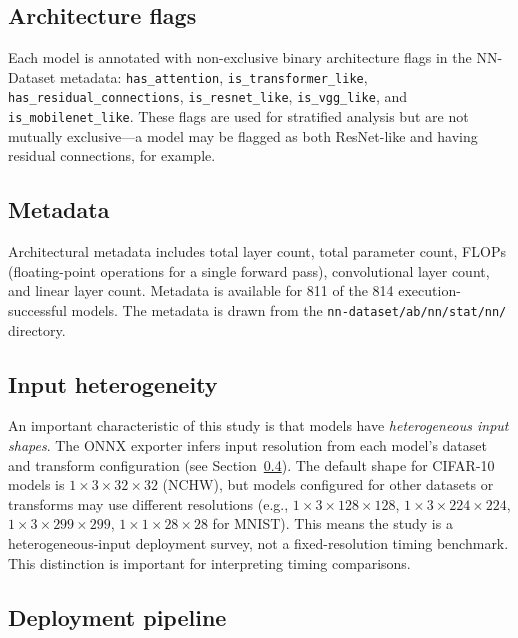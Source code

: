 \documentclass[10pt,twocolumn]{article}
\begin{document}
\subsection{Architecture flags}

Each model is annotated with non-exclusive binary architecture flags in the NN-Dataset metadata: \texttt{has\_attention}, \texttt{is\_transformer\_like}, \texttt{has\_residual\_connections}, \texttt{is\_resnet\_like}, \texttt{is\_vgg\_like}, and \texttt{is\_mobilenet\_like}. These flags are used for stratified analysis but are not mutually exclusive---a model may be flagged as both ResNet-like and having residual connections, for example.

\subsection{Metadata}

Architectural metadata includes total layer count, total parameter count, FLOPs (floating-point operations for a single forward pass), convolutional layer count, and linear layer count. Metadata is available for 811 of the 814 execution-successful models. The metadata is drawn from the \texttt{nn-dataset/ab/nn/stat/nn/} directory.

\subsection{Input heterogeneity}

An important characteristic of this study is that models have \emph{heterogeneous input shapes}. The ONNX exporter infers input resolution from each model's dataset and transform configuration (see Section~\ref{sec:pipeline}). The default shape for CIFAR-10 models is $1\times3\times32\times32$ (NCHW), but models configured for other datasets or transforms may use different resolutions (e.g., $1\times3\times128\times128$, $1\times3\times224\times224$, $1\times3\times299\times299$, $1\times1\times28\times28$ for MNIST). This means the study is a heterogeneous-input deployment survey, not a fixed-resolution timing benchmark. This distinction is important for interpreting timing comparisons.

\subsection{Deployment pipeline}\label{sec:pipeline}
\end{document}
